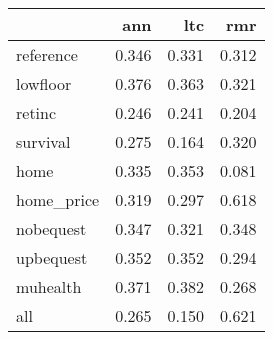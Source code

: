 \begin{tabular}{lrrr}
\toprule
{} &    ann &    ltc &    rmr \\
\midrule
reference  &  0.346 &  0.331 &  0.312 \\
lowfloor   &  0.376 &  0.363 &  0.321 \\
retinc     &  0.246 &  0.241 &  0.204 \\
survival   &  0.275 &  0.164 &  0.320 \\
home       &  0.335 &  0.353 &  0.081 \\
home\_price &  0.319 &  0.297 &  0.618 \\
nobequest  &  0.347 &  0.321 &  0.348 \\
upbequest  &  0.352 &  0.352 &  0.294 \\
muhealth   &  0.371 &  0.382 &  0.268 \\
all        &  0.265 &  0.150 &  0.621 \\
\bottomrule
\end{tabular}
